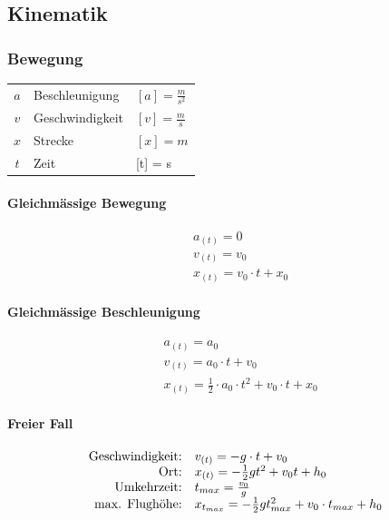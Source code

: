 	\subsection{Kinematik}

	\subsubsection{Bewegung}

	\begin{tabular}{c l l}
		$a$ & Beschleunigung & $ [a] = \frac{m}{s^2} $ \\
		$v$	& Geschwindigkeit & $ [v] = \frac{m}{s} $ \\
		$x$	& Strecke & $ [x] = m $ \\
		$t$ & Zeit & [t] = s \\
	\end{tabular}

	\paragraph{Gleichmässige Bewegung}
		\begin{align*}
			&a_{(t)} = 0 \\ 
			&v_{(t)} = v_0 \\ 
			&x_{(t)} = v_0 \cdot t + x_0
		\end{align*}

	\paragraph{Gleichmässige Beschleunigung}
		\begin{align*}
			&a_{(t)} = a_0 \\ 
			&v_{(t)} = a_0 \cdot t + v_0 \\ 
			&x_{(t)} = \frac{1}{2} \cdot a_0 \cdot t^2 + v_0 \cdot t + x_0
		\end{align*}
	
	\paragraph{Freier Fall}
		\begin{align*}
			\begin{array}{r l}
				\text{Geschwindigkeit:} & v_{(t)} = -g \cdot t + v_0 \\
				\text{Ort:} & x_{(t)} = - \frac{1}{2}gt^2 + v_0t + h_0 \\
				\text{Umkehrzeit:} & t_{max} = \frac{v_0}{g} \\
				\text{max. Flughöhe:} & x_{t_{max}} = -\frac{1}{2}gt_{max}^2 + v_0 \cdot t_{max} + h_0 \\
			\end{array}
		\end{align*}

